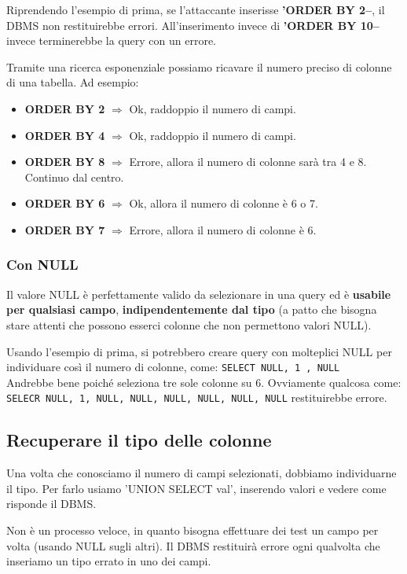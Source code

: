 \documentclass{article}
\begin{document}
Riprendendo l'esempio di prima, se l'attaccante inserisse \textbf{'ORDER BY 2--}, il DBMS non restituirebbe errori. All'inserimento invece di \textbf{'ORDER BY 10--} invece terminerebbe la query con un errore.

Tramite una ricerca esponenziale possiamo ricavare il numero preciso di colonne di una tabella. Ad esempio:
\begin{itemize}
	\item \textbf{ORDER BY 2} $\Rightarrow$ Ok, raddoppio il numero di campi.
	\item \textbf{ORDER BY 4} $\Rightarrow$ Ok, raddoppio il numero di campi.
	\item \textbf{ORDER BY 8} $\Rightarrow$ Errore, allora il numero di colonne sarà tra 4 e 8. Continuo dal centro.
	\item \textbf{ORDER BY 6} $\Rightarrow$ Ok, allora il numero di colonne è 6 o 7.
	\item \textbf{ORDER BY 7} $\Rightarrow$ Errore, allora il numero di colonne è 6.
\end{itemize}

\subsubsection{Con NULL}
Il valore NULL è perfettamente valido da selezionare in una query ed è \textbf{usabile per qualsiasi campo}, \textbf{indipendentemente dal tipo} (a patto che bisogna stare attenti che possono esserci colonne che non permettono valori NULL).

Usando l'esempio di prima, si potrebbero creare query con molteplici NULL per individuare così il numero di colonne, come:
\verb|SELECT NULL, 1 , NULL| \\
Andrebbe bene poiché seleziona tre sole colonne su 6. Ovviamente qualcosa come:\\
\verb|SELECR NULL, 1, NULL, NULL, NULL, NULL, NULL, NULL| restituirebbe errore.

\subsection{Recuperare il tipo delle colonne}
Una volta che conosciamo il numero di campi selezionati, dobbiamo individuarne il tipo. Per farlo usiamo 'UNION SELECT val', inserendo valori e vedere come risponde il DBMS.

Non è un processo veloce, in quanto bisogna effettuare dei test un campo per volta (usando NULL sugli altri).
Il DBMS restituirà errore ogni qualvolta che inseriamo un tipo errato in uno dei campi.
\end{document}
